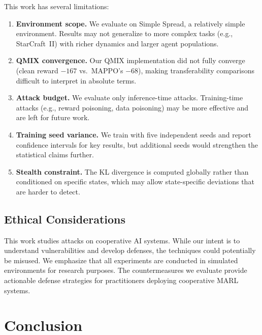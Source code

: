 \documentclass[12pt,a4paper]{article}
\begin{document}
This work has several limitations:

\begin{enumerate}
    \item \textbf{Environment scope.} We evaluate on Simple Spread, a relatively simple environment. Results may not generalize to more complex tasks (e.g., StarCraft~II) with richer dynamics and larger agent populations.

    \item \textbf{QMIX convergence.} Our QMIX implementation did not fully converge (clean reward $-167$ vs.\ MAPPO's $-68$), making transferability comparisons difficult to interpret in absolute terms.

    \item \textbf{Attack budget.} We evaluate only inference-time attacks. Training-time attacks (e.g., reward poisoning, data poisoning) may be more effective and are left for future work.

    \item \textbf{Training seed variance.} We train with five independent seeds and report confidence intervals for key results, but additional seeds would strengthen the statistical claims further.

    \item \textbf{Stealth constraint.} The KL divergence is computed globally rather than conditioned on specific states, which may allow state-specific deviations that are harder to detect.
\end{enumerate}

\subsection{Ethical Considerations}

This work studies attacks on cooperative AI systems. While our intent is to understand vulnerabilities and develop defenses, the techniques could potentially be misused. We emphasize that all experiments are conducted in simulated environments for research purposes. The countermeasures we evaluate provide actionable defense strategies for practitioners deploying cooperative MARL systems.

\section{Conclusion}
\label{sec:conclusion}
\end{document}
